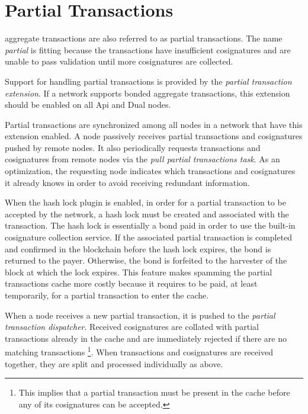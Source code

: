 \section{Partial Transactions}
\label{sec:partials}


 aggregate transactions  are also referred to as partial transactions.
The name \emph{partial} is fitting because the transactions have insufficient cosignatures and are unable to pass validation until more cosignatures are collected.

Support for handling partial transactions is provided by the \emph{partial transaction extension}.
If a network supports bonded aggregate transactions, this extension should be enabled on all Api and Dual nodes.

Partial transactions are synchronized among all nodes in a network that have this extension enabled.
A node passively receives partial transactions and cosignatures pushed by remote nodes.
It also periodically requests transactions and cosignatures from remote nodes via the \emph{pull partial transactions task}.
As an optimization, the requesting node indicates which transactions and cosignatures it already knows in order to avoid receiving redundant information.

When the hash lock plugin is enabled, in order for a partial transaction to be accepted by the network, a hash lock must be created and associated with the transaction.
The hash lock is essentially a bond paid in order to use the built-in cosignature collection service.
If the associated partial transaction is completed and confirmed in the blockchain before the hash lock expires, the bond is returned to the payer.
Otherwise, the bond is forfeited to the harvester of the block at which the lock expires.
This feature makes spamming the partial transactions cache more costly because it requires  to be paid, at least temporarily, for a partial transaction to enter the cache.

When a node receives a new partial transaction, it is pushed to the \emph{partial transaction dispatcher}.
Received cosignatures are collated with partial transactions already in the cache and are immediately rejected if there are no matching transactions
\footnote{This implies that a partial transaction must be present in the cache before any of its cosignatures can be accepted.}.
When transactions and cosignatures are received together, they are split and processed individually as above.


